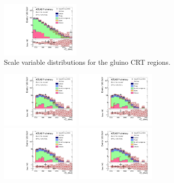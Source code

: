 \begin{figure}[tbph]
\begin{center}
\includegraphics[width=0.35\textwidth]{figures/ATLAS-CONF-2016-078_INT/N-1Plots/AtlasStyle/Preliminary/CRT_SRJigsawSRG3b_LastCut_CRT_minusone}
\end{center}
\caption{Scale variable distributions for the gluino CRT regions.}
\label{fig:CRT_SRJigsawSRG2a_LastCut_CRT_minusone}
\end{figure}

\begin{figure}[tbph]
\begin{center}
\includegraphics[width=0.35\textwidth]{figures/ATLAS-CONF-2016-078_INT/N-1Plots/AtlasStyle/Preliminary/CRT_SRJigsawSRS1a_LastCut_CRT_minusone}
\includegraphics[width=0.35\textwidth]{figures/ATLAS-CONF-2016-078_INT/N-1Plots/AtlasStyle/Preliminary/CRT_SRJigsawSRS1b_LastCut_CRT_minusone}
\includegraphics[width=0.35\textwidth]{figures/ATLAS-CONF-2016-078_INT/N-1Plots/AtlasStyle/Preliminary/CRT_SRJigsawSRS2a_LastCut_CRT_minusone}
\includegraphics[width=0.35\textwidth]{figures/ATLAS-CONF-2016-078_INT/N-1Plots/AtlasStyle/Preliminary/CRT_SRJigsawSRS2b_LastCut_CRT_minusone}

\end{center}
\end{figure}
